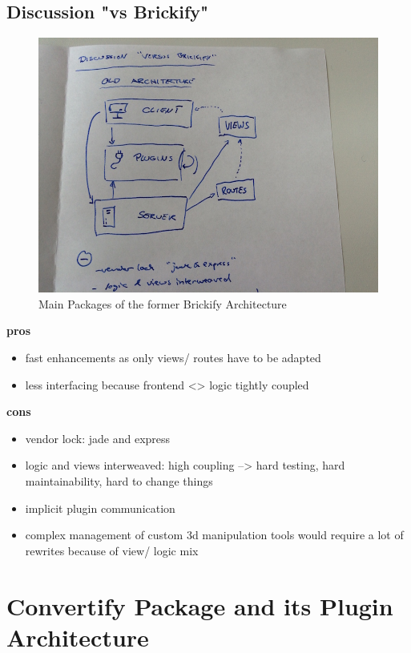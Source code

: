\documentclass[../ClassicThesis.tex]{subfiles}
\begin{document}
\subsection{Discussion "vs Brickify"}

\begin{figure}
\label{fig:architecture_overview_brickify}
\includegraphics[width=1\columnwidth]{Images/03-architecture_overview_brickify.JPG}
\caption{Main Packages of the former Brickify Architecture}
\end{figure}

\textbf{pros}
\begin{itemize}
\item fast enhancements as only views/ routes have to be adapted
\item less interfacing because frontend <> logic tightly coupled
\end{itemize}

\textbf{cons} 
\begin{itemize}
\item vendor lock: jade and express
\item logic and views interweaved: high coupling --> hard testing, hard maintainability, hard to change things
\item implicit plugin communication 
\item complex management of custom 3d manipulation tools would require a lot of rewrites because of view/ logic mix
\end{itemize}




\section{Convertify Package and its Plugin Architecture}
\end{document}

